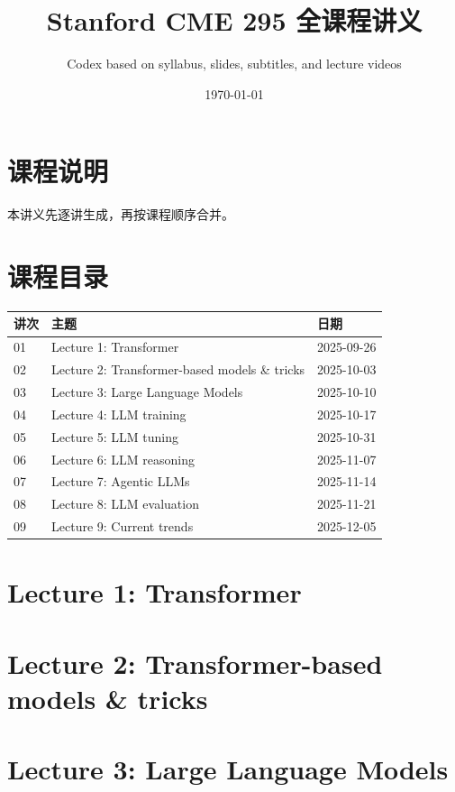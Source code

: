 \documentclass[a4paper]{article}
\title{Stanford CME 295 全课程讲义}
\author{Codex based on syllabus, slides, subtitles, and lecture videos}
\date{\today}
\begin{document}
\maketitle
\tableofcontents
\newpage
\section*{课程说明}
本讲义先逐讲生成，再按课程顺序合并。
\section*{课程目录}
\begin{longtable}{p{}p{}p{}}
\textbf{讲次} & \textbf{主题} & \textbf{日期}\\
\hline
01 & Lecture 1: Transformer & 2025-09-26\\
02 & Lecture 2: Transformer-based models \& tricks & 2025-10-03\\
03 & Lecture 3: Large Language Models & 2025-10-10\\
04 & Lecture 4: LLM training & 2025-10-17\\
05 & Lecture 5: LLM tuning & 2025-10-31\\
06 & Lecture 6: LLM reasoning & 2025-11-07\\
07 & Lecture 7: Agentic LLMs & 2025-11-14\\
08 & Lecture 8: LLM evaluation & 2025-11-21\\
09 & Lecture 9: Current trends & 2025-12-05\\
\end{longtable}

\section{Lecture 1: Transformer}


\section{Lecture 2: Transformer-based models \& tricks}


\section{Lecture 3: Large Language Models}

\end{document}
